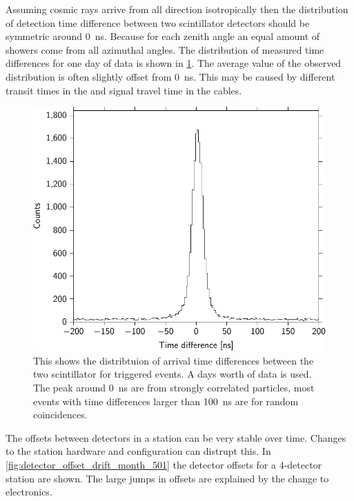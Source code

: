 Assuming cosmic rays arrive from all direction isotropically then the distribution of detection time difference between two scintillator detectors should be symmetric around \SI{0}{\ns}. Because for each zenith angle an equal amount of showers come from all azimuthal angles. The distribution of measured time differences for one day of data is shown in \cref{fig:detector_time_difference_distribution}. The average value of the observed distribution is often slightly offset from \SI{0}{\ns}. This may be caused by different transit times in the \pmt and signal travel time in the cables.

\begin{figure}
    \centering
    \includegraphics{plots/station/detector_time_difference_distribution}
    \caption{This shows the distribtuion of arrival time differences between the two scintillator for triggered events. A days worth of data is used. The peak around \SI{0}{\ns} are from strongly correlated particles, most events with time differences larger than \SI{100}{\ns} are for random coincidences.}
    \label{fig:detector_time_difference_distribution}
\end{figure}

The offsets between detectors in a station can be very stable over time. Changes to the station hardware and configuration can distrupt this. In \cref{fig:detector_offset_drift_month_501} the detector offsets for a 4-detector station are shown. The large jumps in offsets are explained by the change to \hisparciii electronics.

